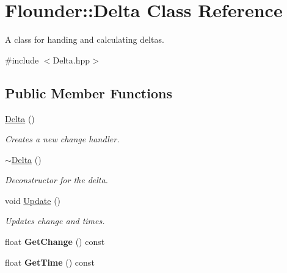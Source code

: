 \hypertarget{class_flounder_1_1_delta}{}\section{Flounder\+:\+:Delta Class Reference}
\label{class_flounder_1_1_delta}


A class for handing and calculating deltas.  




{\ttfamily \#include $<$Delta.\+hpp$>$}

\subsection*{Public Member Functions}
\begin{DoxyCompactItemize}
\item 
\hyperlink{class_flounder_1_1_delta_a9fc48dafff86ce24ac4f108aa397b8c7}{Delta} ()
\begin{DoxyCompactList}\small\item\em Creates a new change handler. \end{DoxyCompactList}\item 
\hyperlink{class_flounder_1_1_delta_a1dfd186406e464b12af300ac0141858e}{$\sim$\+Delta} ()
\begin{DoxyCompactList}\small\item\em Deconstructor for the delta. \end{DoxyCompactList}\item 
void \hyperlink{class_flounder_1_1_delta_ad6f9a487cf22f4e3b4303bbfbfd556fb}{Update} ()
\begin{DoxyCompactList}\small\item\em Updates change and times. \end{DoxyCompactList}\item 
\mbox{\label{class_flounder_1_1_delta_a91d8756526e6150b7539b633498f2cde}} 
float {\bfseries Get\+Change} () const
\item 
\mbox{\label{class_flounder_1_1_delta_a9713e144640413e74ab7b7fc01b7e8d6}} 
float {\bfseries Get\+Time} () const
\end{DoxyCompactItemize}
